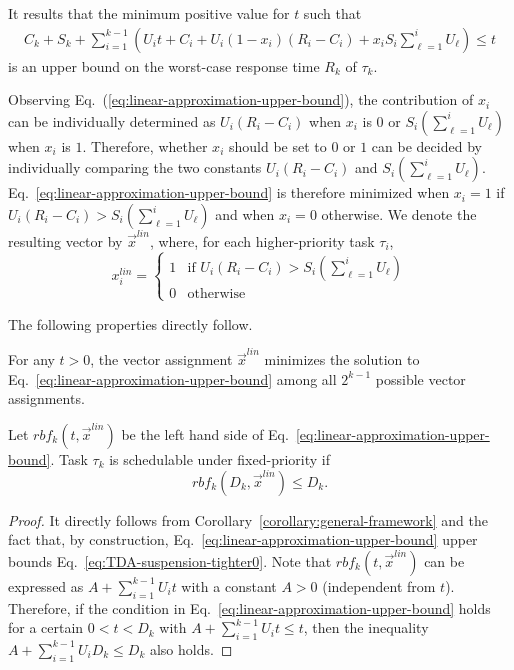 It results that the minimum positive value for $t$ such that
{\footnotesize\begin{align}
\label{eq:linear-approximation-upper-bound}
C_k + S_k + \sum_{i=1}^{k-1}  \left(U_i t + C_i + U_i (1-x_i)(R_i-C_i) + x_i S_i\sum_{\ell=1}^{i}U_\ell \right) \leq t
\end{align}}
is an upper bound on the worst-case response time $R_k$ of $\tau_k$.

Observing Eq.~(\ref{eq:linear-approximation-upper-bound}), the
contribution of $x_i$ can be individually determined as $U_i(R_i-C_i)$
when $x_i$ is $0$ or $S_i(\sum_{\ell=1}^{i}U_\ell)$ when $x_i$ is
$1$. Therefore, whether $x_i$ should be set to $0$ or $1$ can be 
decided by individually comparing the two constants
$U_i(R_i-C_i)$ and $S_i(\sum_{\ell=1}^{i}U_\ell)$. Eq.~\eqref{eq:linear-approximation-upper-bound} is therefore minimized when $x_i=1$ if $U_i(R_i-C_i) > S_i(\sum_{\ell=1}^{i}U_\ell)$ and when $x_i = 0$ otherwise. We denote the resulting vector by $\vec{x}^{\mathit{lin}}$, where, for
each higher-priority task $\tau_i$,
\begin{equation}
\label{eq:x-linear}
x_i^{\mathit{lin}} =
\begin{cases}
1 & \text{if~} U_i(R_i-C_i) > S_i(\sum_{\ell=1}^{i}U_\ell) \\
0 & \text{otherwise}
\end{cases}
\end{equation}

The following properties directly follow.
\begin{Property}
For any $t > 0$, the vector assignment $\vec{x}^{\mathit{lin}}$ minimizes
  the solution to Eq.~\eqref{eq:linear-approximation-upper-bound} among all $2^{k-1}$ possible vector assignments.
\end{Property}



\begin{theorem}
\label{theorem:linear-time-test}
Let $rbf_k(t, \vec{x}^{\mathit{lin}})$ be the left hand side of Eq.~\eqref{eq:linear-approximation-upper-bound}. Task $\tau_k$ is schedulable
  under fixed-priority if
  \begin{equation}
    \label{eq:linear-time-test}
    rbf_k(D_k, \vec{x}^{\mathit{lin}}) \leq D_k.
  \end{equation}
\end{theorem}
\begin{proof}
  It directly follows from Corollary~\ref{corollary:general-framework}
  and the fact that, by construction,
  Eq.~\eqref{eq:linear-approximation-upper-bound} upper bounds
  Eq.~\eqref{eq:TDA-suspension-tighter0}. Note that $rbf_k(t,
  \vec{x}^{\mathit{lin}})$ can be expressed as $A+\sum_{i=1}^{k-1} U_i
  t$ with a constant $A > 0$ (independent from $t$). Therefore, if the
  condition in Eq.~\eqref{eq:linear-approximation-upper-bound} holds
  for a certain $0 < t < D_k$ with $A+\sum_{i=1}^{k-1} U_i t \leq t$, then
  the inequality $A+\sum_{i=1}^{k-1} U_i D_k \leq D_k$ also holds.
\end{proof}

